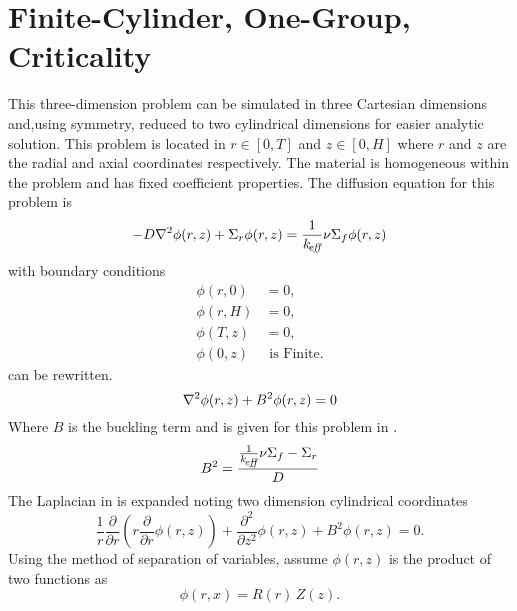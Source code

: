 \section{Finite-Cylinder, One-Group, Criticality}
  \label{sec:deriv_finite_cyl}
  This three-dimension problem can be simulated in three Cartesian dimensions 
  and,using symmetry, reduced to two cylindrical dimensions for easier analytic 
  solution. This problem is located in $r \in [0,T]$ and $z \in [0,H]$ where $r$
  and $z$ are the radial and axial coordinates respectively. The 
  material is homogeneous within the problem and has fixed coefficient 
  properties. The diffusion equation for this problem is 
  \begin{equation}
    \label{eq:finite_cyl}
    -D \mathbf{\nabla}^2 \phi(r,z) + \Sigma_r \phi(r,z) = \frac{1}{k_{\!\mbox{\scriptsize \em eff}}} \nu \Sigma_f
      \phi(r,z)
  \end{equation}
  with boundary conditions
  \begin{align}
    \label{eq:finite_cyl_bcz0}
    \phi(r,0) &= 0 ,\\
    \label{eq:finite_cyl_bczH}
    \phi(r,H) &= 0 ,\\
    \label{eq:finite_cyl_bcrT}
    \phi(T,z) &= 0 ,\\
    \label{eq:finite_cyl_bcr0}
    \phi(0,z) & \text{ is Finite}.
  \end{align}
   can be rewritten. 
  \begin{equation}
    \label{eq:finite_cyl_buckle}
    \mathbf{\nabla}^2 \phi(r,z) + B^2 \phi(r,z) = 0
  \end{equation}
  Where $B$ is the buckling term and is given for this problem in
  .
  \begin{equation}
    \label{eq:finite_cyl_b2}
    B^2 = \frac{\frac{1}{k_{\!\mbox{\scriptsize \em eff}}} \nu \Sigma_f - \Sigma_r }{D}
  \end{equation}
  The Laplacian in  is expanded noting two dimension
  cylindrical coordinates
  \begin{equation}
    \label{eq:finite_cyl_deriv}
    \frac{1}{r} \frac{\partial}{\partial r} \left( r \frac{\partial}{\partial r}
      \phi(r,z) \right) + \frac{\partial^2}{\partial z^2} \phi(r,z) + 
      B^2 \phi(r,z) = 0.
  \end{equation}
  Using the method of separation of variables, assume $\phi(r,z)$ is the product
  of two functions as
  \begin{equation}
    \label{eq:finite_cyl_separation}
    \phi(r,x) = R(r) \, Z(z).
  \end{equation}
